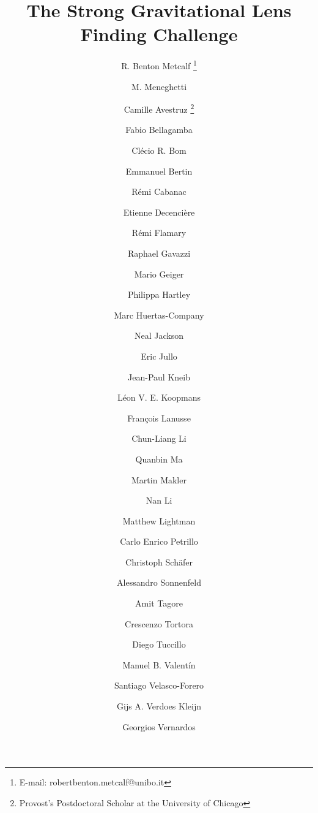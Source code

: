 \documentclass{aa}
\begin{document}
\title{The Strong Gravitational  Lens Finding Challenge}

\author{
R. Benton Metcalf \thanks{E-mail: robertbenton.metcalf@unibo.it} 
\and
M. Meneghetti 
\and
Camille Avestruz \fnmsep\thanks{Provost's Postdoctoral Scholar at the University of Chicago}
\and
Fabio Bellagamba
\and
Cl\'ecio R. Bom
\and
Emmanuel Bertin
\and
R\'emi Cabanac 
\and
Etienne Decenci\`ere 
\and
R\'emi Flamary 
\and
Raphael Gavazzi 
\and
Mario Geiger  
\and
Philippa Hartley 
\and
Marc Huertas-Company 
\and
Neal Jackson 
\and
Eric Jullo 
\and
Jean-Paul Kneib 
\and
L\'{e}on V. E. Koopmans 
\and
Fran\c{c}ois Lanusse 
\and
Chun-Liang Li 
\and
Quanbin Ma 
\and
Martin Makler 
\and
Nan Li 
\and
Matthew Lightman 
\and
Carlo Enrico Petrillo 
\and
Christoph Sch\"{a}fer 
\and
Alessandro Sonnenfeld 
\and
Amit Tagore 
\and
Crescenzo Tortora 
\and
Diego Tuccillo 
\and
Manuel B. Valent\'in 
\and
Santiago Velasco-Forero 
\and
Gijs A. Verdoes Kleijn 
\and
Georgios Vernardos 
}
\end{document}
